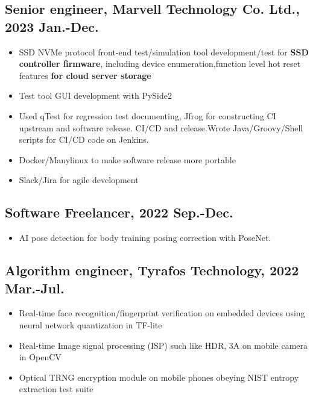 \documentclass[11pt]{article}
\begin{document}
\begin{multicols*}{2}
\vspace{2em}

\subsection*{Senior engineer, Marvell Technology Co. Ltd., 2023 Jan.-Dec.}
\begin{itemize}[noitemsep]
    \item SSD NVMe protocol front-end test/simulation tool development/test for \textbf{SSD controller firmware}, including device enumeration,function level hot reset features\textbf{ for cloud server storage}
    \item Test tool GUI development with PySide2
    \item Used qTest for regression test documenting, Jfrog for constructing CI upstream and software release. CI/CD and release.Wrote Java/Groovy/Shell scripts for CI/CD code on Jenkins.
    \item Docker/Manylinux to make software release more portable
    \item Slack/Jira for agile development
\end{itemize}

\vspace{2em}

\subsection*{Software Freelancer, 2022 Sep.-Dec.}
\begin{itemize}[noitemsep]
    \item AI pose detection for body training posing correction with PoseNet.
\end{itemize}

\vspace{2em}

\subsection*{\textbf{Algorithm engineer}, Tyrafos Technology, 2022 Mar.-Jul.}
\begin{itemize}[noitemsep]
    \item Real-time face recognition/fingerprint verification on embedded devices using neural network quantization in TF-lite
    \item Real-time Image signal processing (ISP) such like HDR, 3A on mobile camera in OpenCV
    \item Optical TRNG encryption module on mobile phones obeying NIST entropy extraction test suite
\end{itemize}


\end{multicols*}
\end{document}
